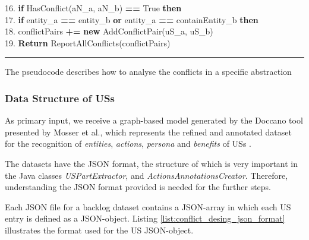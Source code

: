 \begin{MyListing}
\begin{flushleft}
	 16. \hspace{26pt}\textbf{if} HasConflict(aN\_a, aN\_b) \textbf{==} True \textbf{then}\\
	 17. \hspace{45pt}\textbf{if} entity\_a \textbf{==} entity\_b \textbf{or} entity\_a \textbf{==} containEntity\_b \textbf{then}\\
	 18. \hspace{55pt}conflictPairs \textbf{+=} \textbf{new} AddConflictPair(uS\_a, uS\_b)\\
	 19. \hspace{6pt}\textbf{Return} ReportAllConflicts(conflictPairs)\\
\end{flushleft}
\hrule
\caption{The pseudocode describes how to analyse the conflicts in a specific abstraction}\label{list:conflict_pseudocode}
\end{MyListing}
\subsubsection*{Data Structure of USs}\label{conflict_design_step_0}
As primary input, we receive a graph-based model generated by the Doccano tool presented by Mosser et al., which represents the refined and annotated dataset for the recognition of \emph{entities}, \emph{actions}, \emph{persona} and \emph{benefits} of USs \cite{arulmohan2023extracting}.

The datasets have the JSON format, the structure of which is very important in the Java classes \textit{USPartExtractor}, and \textit{ActionsAnnotationsCreator}. Therefore, understanding the JSON format provided is needed for the further steps.

Each JSON file for a backlog dataset contains a JSON-array in which each US entry is defined as a JSON-object. Listing \ref{list:conflict_desing_json_format} illustrates the format used for the US JSON-object.

